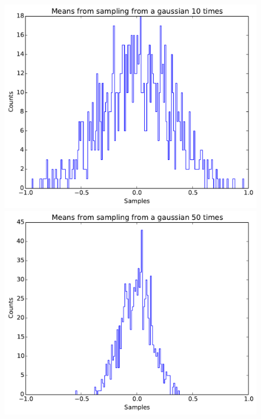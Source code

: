 \documentclass[11pt,letterpaper]{article}
\begin{document}
\begin{figure}
    \centering
    \begin{minipage}[t]{0.45\textwidth}
        \centering
        \includegraphics[width=\textwidth]{figures/problem3_2.pdf}
    \end{minipage}
    \hspace{0.5cm}
    \begin{minipage}[t]{0.45\textwidth}
        \centering
        \includegraphics[width=\textwidth]{figures/problem3_3.pdf}
    \end{minipage}

\end{figure}
\end{document}
